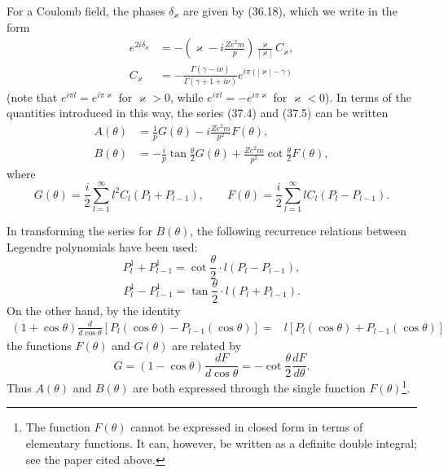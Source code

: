 For a Coulomb field, the phases $\delta_\varkappa$ are given by (36.18), which we write in the form
\begin{equation}
\begin{aligned}
e^{2i\delta_\varkappa}
&=-\left(\varkappa-i\frac{Ze^2m}{p}\right)
\frac{\varkappa}{|\varkappa|}C_\varkappa,\\
C_\varkappa
&=-\frac{\Gamma(\gamma-i\nu)}{\Gamma(\gamma+1+i\nu)}
e^{i\pi(|\varkappa|-\gamma)}
\end{aligned}
\tag{37.6}
\end{equation}
(note that $e^{i\pi l}=e^{i\pi\varkappa}$ for $\varkappa>0$, while $e^{i\pi l}=-e^{i\pi\varkappa}$ for $\varkappa<0$). In terms of the quantities introduced in this way, the series (37.4) and (37.5) can be written
\begin{equation}
\begin{aligned}
A(\theta)&=\frac1pG(\theta)-i\frac{Ze^2m}{p^2}F(\theta),\\
B(\theta)&=-\frac ip\tan\frac\theta2G(\theta)
+\frac{Ze^2m}{p^2}\cot\frac\theta2F(\theta),
\end{aligned}
\tag{37.7}
\end{equation}
where
\begin{equation}
G(\theta)=\frac i2\sum_{l=1}^{\infty}l^2C_l(P_l+P_{l-1}),
\qquad
F(\theta)=\frac i2\sum_{l=1}^{\infty}lC_l(P_l-P_{l-1}).
\tag{37.8}
\end{equation}

In transforming the series for $B(\theta)$, the following recurrence relations between Legendre polynomials have been used:
\begin{equation}
P_l^1+P_{l-1}^1=\cot\frac\theta2\cdot l(P_l-P_{l-1}),
\tag{37.9}
\end{equation}
\begin{equation}
P_l^1-P_{l-1}^1=\tan\frac\theta2\cdot l(P_l+P_{l-1}).
\tag{37.10}
\end{equation}
On the other hand, by the identity
\begin{equation}
\begin{aligned}
(1+\cos\theta)\frac d{d\cos\theta}
[P_l(\cos\theta)-P_{l-1}(\cos\theta)]
={}&l[P_l(\cos\theta)+P_{l-1}(\cos\theta)]
\end{aligned}
\tag{37.11}
\end{equation}
the functions $F(\theta)$ and $G(\theta)$ are related by
\begin{equation}
G=(1-\cos\theta)\frac{dF}{d\cos\theta}
=-\cot\frac\theta2\frac{dF}{d\theta}.
\tag{37.12}
\end{equation}
Thus $A(\theta)$ and $B(\theta)$ are both expressed through the single function $F(\theta)$\footnote{The function $F(\theta)$ cannot be expressed in closed form in terms of elementary functions. It can, however, be written as a definite double integral; see the paper cited above.}.
